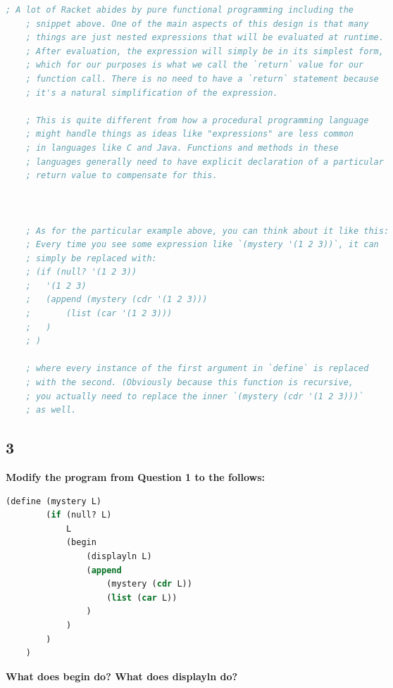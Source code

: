 \documentclass{article}
\begin{document}
\begin{lstlisting}[language=lisp,style=redStyle]
    ; A lot of Racket abides by pure functional programming including the
    ; snippet above. One of the main aspects of this design is that many
    ; things are just nested expressions that will be evaluated at runtime.
    ; After evaluation, the expression will simply be in its simplest form,
    ; which for our purposes is what we call the `return` value for our
    ; function call. There is no need to have a `return` statement because
    ; it's a natural simplification of the expression. 
    
    ; This is quite different from how a procedural programming language 
    ; might handle things as ideas like "expressions" are less common
    ; in languages like C and Java. Functions and methods in these 
    ; languages generally need to have explicit declaration of a particular
    ; return value to compensate for this. 



    ; As for the particular example above, you can think about it like this:
    ; Every time you see some expression like `(mystery '(1 2 3))`, it can 
    ; simply be replaced with:
    ; (if (null? '(1 2 3))
    ;   '(1 2 3)
    ;   (append (mystery (cdr '(1 2 3)))
    ;       (list (car '(1 2 3)))
    ;   )
    ; )

    ; where every instance of the first argument in `define` is replaced 
    ; with the second. (Obviously because this function is recursive,
    ; you actually need to replace the inner `(mystery (cdr '(1 2 3)))`
    ; as well. 
\end{lstlisting}

\subsection*{3}
\begin{adjustwidth}{2em}{0em}
    \textbf{Modify the program from Question 1 to the follows:} 
\end{adjustwidth}

\begin{lstlisting}[language=lisp]
    (define (mystery L) 
        (if (null? L)
            L
            (begin 
                (displayln L)
                (append 
                    (mystery (cdr L))
                    (list (car L))
                )
            )
        )
    )
\end{lstlisting}

\begin{adjustwidth}{2em}{0em}
    \textbf{What does begin do? What does displayln do?} 
\end{adjustwidth}
\end{document}
